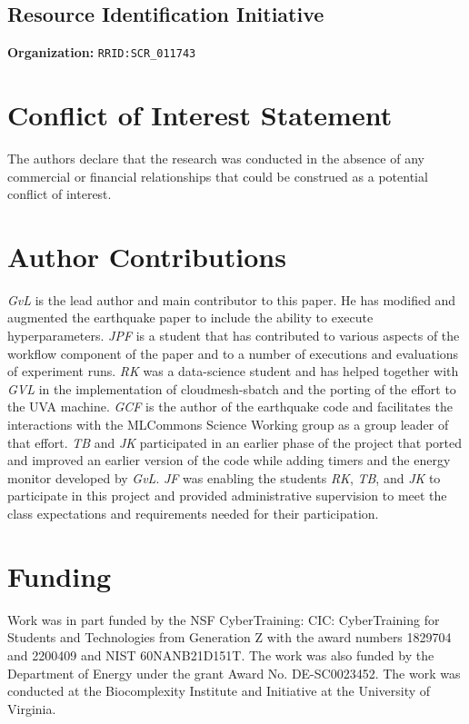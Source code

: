\documentclass[utf8]{FrontiersinVancouver} %
\begin{document}
\subsection{Resource Identification Initiative}

{\bf Organization:} \verb|RRID:SCR_011743|

\section*{Conflict of Interest Statement}

The authors declare that the research was conducted in the absence of any commercial or financial relationships that could be construed as a potential conflict of interest.

\section*{Author Contributions}

{\em GvL} is the lead author and main contributor to this paper. He has modified and augmented the earthquake paper to include the ability to execute hyperparameters. {\em JPF} is a student that has contributed to various aspects of the workflow component of the paper and to a number of executions and evaluations of experiment runs. {\em RK} was a data-science student and has helped together with {\em GVL} in the implementation of cloudmesh-sbatch and the porting of the effort to the UVA machine.  {\em GCF} is the author of the earthquake code and facilitates the interactions with the MLCommons Science Working group as a group leader of that effort. {\em TB} and {\em JK} participated in an earlier phase of the project that ported and improved an earlier version of the code while adding timers and the energy monitor developed by {\em GvL}. {\em JF} was enabling the students {\em RK}, {\em TB}, and {\em JK} to participate in this project and provided administrative supervision to meet the class expectations and requirements needed for their participation.

\section*{Funding}

Work was in part funded by the NSF CyberTraining: CIC: CyberTraining for Students and Technologies from Generation Z with the award numbers 1829704 and 2200409 and NIST 60NANB21D151T.  The work was also funded by the Department of Energy under the grant Award No. DE-SC0023452. The work was conducted at the Biocomplexity Institute and Initiative at the University of Virginia.
\end{document}
